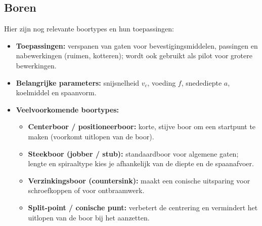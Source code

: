 \documentclass[a4paper,11pt,twoside]{report}
\begin{document}
\subsection{Boren}
Hier zijn nog relevante boortypes en hun toepassingen:
\begin{itemize}
    \item \textbf{Toepassingen:} verspanen van gaten voor bevestigingsmiddelen, passingen en nabewerkingen (ruimen, kotteren); wordt ook gebruikt als pilot voor grotere bewerkingen.
    \item \textbf{Belangrijke parameters:} snijsnelheid $v_c$, voeding $f$, snedediepte $a$, koelmiddel en spaanvorm.
    \item \textbf{Veelvoorkomende boortypes:}
          \begin{itemize}
              \item \textbf{Centerboor / positioneerboor:} korte, stijve boor om een startpunt te maken (voorkomt uitlopen van de boor).
              \item \textbf{Steekboor (jobber / stub):} standaardboor voor algemene gaten; lengte en spiraaltype kies je afhankelijk van de diepte en de spaanafvoer.
              \item \textbf{Verzinkingsboor (countersink):} maakt een conische uitsparing voor schroefkoppen of voor ontbraamwerk.
              \item \textbf{Split-point / conische punt:} verbetert de centrering en vermindert het uitlopen van de boor bij het aanzetten.
          \end{itemize}
\end{itemize}
\end{document}
